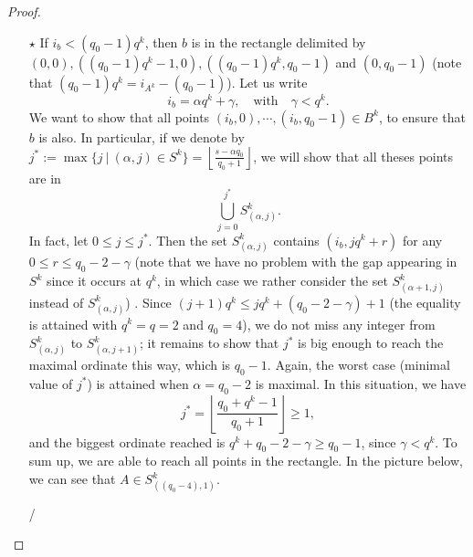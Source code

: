 \documentclass[a4paper]{article}
\newcommand\jade[1]{\textcolor{purple}{#1}}
\begin{document}
\begin{proof}
\begin{itemize}
    \item[$\star$] If $i_b < (q_0-1)q^k$, then $b$ is in the rectangle delimited by $(0,0), ((q_0-1)q^k-1,0), ((q_0-1)q^k,q_0-1)$ and $(0,q_0-1)$ (note that $(q_0-1)q^k=i_{A^k}-(q_0-1)$). Let us write
    \[i_b = \alpha q^k+\gamma, \quad \mathrm{with} \quad \gamma < q^k.\]
    We want to show that all points $(i_b,0),\cdots,(i_b,q_0-1) \in B^k$, to ensure that $b$ is also. In particular, if we denote by $j^*:=\max \{j \ | \ (\alpha,j) \in S^k\} = \left\lfloor \frac{s-\alpha q_0}{q_0+1}\right\rfloor$, we will show that all theses points are in 
    \[\bigcup_{j=0}^{j^*} S^k_{(\alpha,j)}.\]
    In fact, let $0 \leq j \leq j^*$. Then the set $ S^k_{(\alpha,j)}$ contains $(i_b,jq^k+r)$ for any $0 \leq r \leq q_0-2-\gamma$ (note that we have no problem with the gap appearing in $S^k$ since it occurs at $q^k$, in which case we rather consider the set  $ S^k_{(\alpha+1,j)}$ instead of  $ S^k_{(\alpha,j)}$) . Since $(j+1)q^k \leq jq^k + (q_0-2-\gamma)+1$ (the equality is attained with $q^k=q=2$ and $q_0=4$), we do not miss any integer from $S^k_{(\alpha,j)}$ to $S^k_{(\alpha,j+1)}$; it remains to show that $j^*$ is big enough to reach the maximal ordinate this way, which is $q_0-1$. Again, the worst case (minimal value of $j^*$) is attained when $\alpha = q_0-2$ is maximal. In this situation, we have 
    \[j^* = \left\lfloor \dfrac{q_0+q^k-1}{q_0+1}\right\rfloor \geq 1,\]
    and the biggest ordinate reached is $q^k+q_0-2-\gamma \geq q_0-1$, since $\gamma < q^k$. To sum up, we are able to reach all points in the rectangle. In the picture below, we can see that $A \in S^k_{((q_0-4),1)}$. 

/%

\begin{figure}[h]
\begin{center}
\end{center}
\end{figure}
\end{itemize}
\end{proof}
\end{document}
